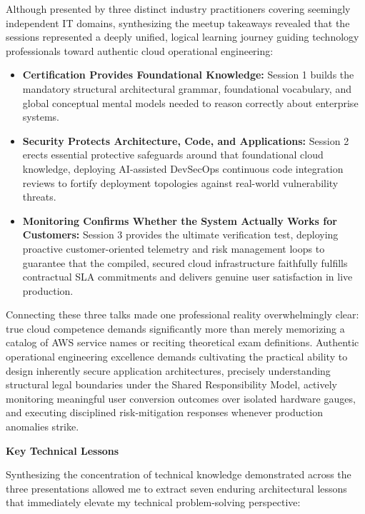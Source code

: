 Although presented by three distinct industry practitioners covering
seemingly independent IT domains, synthesizing the meetup takeaways
revealed that the sessions represented a deeply unified, logical
learning journey guiding technology professionals toward authentic cloud
operational engineering:

\begin{itemize}
\tightlist
\item
  \textbf{Certification Provides Foundational Knowledge:} Session 1
  builds the mandatory structural architectural grammar, foundational
  vocabulary, and global conceptual mental models needed to reason
  correctly about enterprise systems.
\item
  \textbf{Security Protects Architecture, Code, and Applications:}
  Session 2 erects essential protective safeguards around that
  foundational cloud knowledge, deploying AI-assisted DevSecOps
  continuous code integration reviews to fortify deployment topologies
  against real-world vulnerability threats.
\item
  \textbf{Monitoring Confirms Whether the System Actually Works for
  Customers:} Session 3 provides the ultimate verification test,
  deploying proactive customer-oriented telemetry and risk management
  loops to guarantee that the compiled, secured cloud infrastructure
  faithfully fulfills contractual SLA commitments and delivers genuine
  user satisfaction in live production.
\end{itemize}

Connecting these three talks made one professional reality
overwhelmingly clear: true cloud competence demands significantly more
than merely memorizing a catalog of AWS service names or reciting
theoretical exam definitions. Authentic operational engineering
excellence demands cultivating the practical ability to design
inherently secure application architectures, precisely understanding
structural legal boundaries under the Shared Responsibility Model,
actively monitoring meaningful user conversion outcomes over isolated
hardware gauges, and executing disciplined risk-mitigation responses
whenever production anomalies strike.

\vspace{0.5em}\noindent\textbf{Key Technical Lessons}\par

Synthesizing the concentration of technical knowledge demonstrated
across the three presentations allowed me to extract seven enduring
architectural lessons that immediately elevate my technical
problem-solving perspective:

